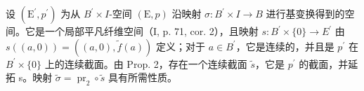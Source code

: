 设 \((\mathrm{E}^{\prime},p^{\prime})\) 为从 \(B^{\prime}\times I\)-空间 \((\mathrm{E},p)\) 沿映射 \(\sigma\colon B^{\prime}\times I\to B\) 进行基变换得到的空间。它是一个局部平凡纤维空间（I, p. 71, cor. 2），且映射 \(s\colon B^{\prime}\times\{0\}\to E^{\prime}\) 由 \(s((a,0))=((a,0),\widetilde{f}(a))\) 定义；对于 \(a\in B^{\prime}\)，它是连续的，并且是 \(p^{\prime}\) 在 \(B^{\prime}\times\{0\}\) 上的连续截面。由 Prop. 2，存在一个连续截面 \(\widetilde{s}\)，它是 \(p^{\prime}\) 的截面，并延拓 s。映射 \(\widetilde{\sigma}=\operatorname{pr}_{2}\circ\widetilde{s}\) 具有所需性质。

